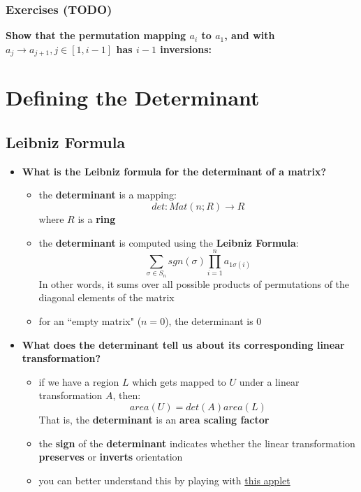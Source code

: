 \documentclass{exam}
\begin{document}
\subsubsection{Exercises (TODO)}

\begin{questions}

\label{ex69}
\question \textbf{Show that the permutation mapping $a_i$ to $a_1$, and with $a_j \to a_{j+1}, j \in [1,i-1]$ has $i-1$ inversions:}
\end{questions}

\section{Defining the Determinant}

\subsection{Leibniz Formula}

\begin{itemize}
    \item \textbf{What is the Leibniz formula for the determinant of a matrix?}
    \begin{itemize}
        \item the \textbf{determinant} is a mapping:
        \[
        det : Mat(n;R) \to R
        \]
        where $R$ is a \textbf{ring}
        \item the \textbf{determinant} is computed using the \textbf{Leibniz Formula}:
        \[
        \sum_{\sigma \in S_n} sgn(\sigma)\prod_{i = 1}^n a_{1\sigma(i)}
        \]
        In other words, it sums over all possible products of permutations of the diagonal elements of the matrix
        \item for an ``empty matrix" ($n = 0$), the determinant is 0
    \end{itemize}
    \item \textbf{What does the determinant tell us about its corresponding linear transformation?}
    \begin{itemize}
        \item if we have a region $L$ which gets mapped to $U$ under a linear transformation $A$, then:
        \[
        area(U) = det(A)area(L)
        \]
        That is, the \textbf{determinant} is an \textbf{area scaling factor}
        \item the \textbf{sign} of the \textbf{determinant} indicates whether the linear transformation \textbf{preserves} or \textbf{inverts} orientation
        \item you can better understand this by playing with \href{http://halg.s3-website-eu-west-1.amazonaws.com}{this applet}
    \end{itemize}
\end{itemize}
\end{document}
